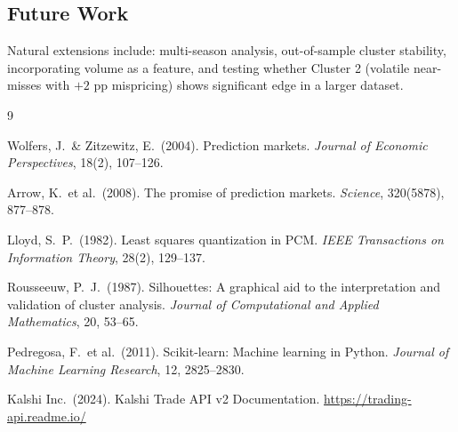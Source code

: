 \documentclass[11pt, a4paper]{article}
\begin{document}
\subsection{Future Work}
Natural extensions include: multi-season analysis, out-of-sample cluster stability, incorporating volume as a feature, and testing whether Cluster 2 (volatile near-misses with $+2$ pp mispricing) shows significant edge in a larger dataset.

\begin{thebibliography}{9}

Wolfers, J.\ \& Zitzewitz, E.\ (2004).
Prediction markets.
\textit{Journal of Economic Perspectives}, 18(2), 107--126.

Arrow, K.\ et al.\ (2008).
The promise of prediction markets.
\textit{Science}, 320(5878), 877--878.

Lloyd, S.\ P.\ (1982).
Least squares quantization in PCM.
\textit{IEEE Transactions on Information Theory}, 28(2), 129--137.

Rousseeuw, P.\ J.\ (1987).
Silhouettes: A graphical aid to the interpretation and validation of cluster analysis.
\textit{Journal of Computational and Applied Mathematics}, 20, 53--65.

Pedregosa, F.\ et al.\ (2011).
Scikit-learn: Machine learning in Python.
\textit{Journal of Machine Learning Research}, 12, 2825--2830.

Kalshi Inc.\ (2024).
Kalshi Trade API v2 Documentation.
\url{https://trading-api.readme.io/}

\end{thebibliography}
\end{document}
